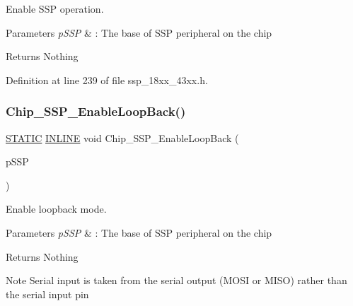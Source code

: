 Enable S\+SP operation. 


\begin{DoxyParams}{Parameters}
{\em p\+S\+SP} & \+: The base of S\+SP peripheral on the chip \\
\hline
\end{DoxyParams}
\begin{DoxyReturn}{Returns}
Nothing 
\end{DoxyReturn}


Definition at line 239 of file ssp\+\_\+18xx\+\_\+43xx.\+h.

\mbox{\label{group___s_s_p__18_x_x__43_x_x_ga8683ccce6ba5578103efcb791f39cff8}} 
\subsubsection{\texorpdfstring{Chip\+\_\+\+S\+S\+P\+\_\+\+Enable\+Loop\+Back()}{Chip\_SSP\_EnableLoopBack()}}
{\footnotesize\ttfamily \hyperlink{group___l_p_c___types___public___macros_ga10b2d890d871e1489bb02b7e70d9bdfb}{S\+T\+A\+T\+IC} \hyperlink{spifi__18xx__43xx_8h_a2eb6f9e0395b47b8d5e3eeae4fe0c116}{I\+N\+L\+I\+NE} void Chip\+\_\+\+S\+S\+P\+\_\+\+Enable\+Loop\+Back (\begin{DoxyParamCaption}\item[{\hyperlink{struct_l_p_c___s_s_p___t}{L\+P\+C\+\_\+\+S\+S\+P\+\_\+T} $\ast$}]{p\+S\+SP }\end{DoxyParamCaption})}



Enable loopback mode. 


\begin{DoxyParams}{Parameters}
{\em p\+S\+SP} & \+: The base of S\+SP peripheral on the chip \\
\hline
\end{DoxyParams}
\begin{DoxyReturn}{Returns}
Nothing 
\end{DoxyReturn}
\begin{DoxyNote}{Note}
Serial input is taken from the serial output (M\+O\+SI or M\+I\+SO) rather than the serial input pin 
\end{DoxyNote}


